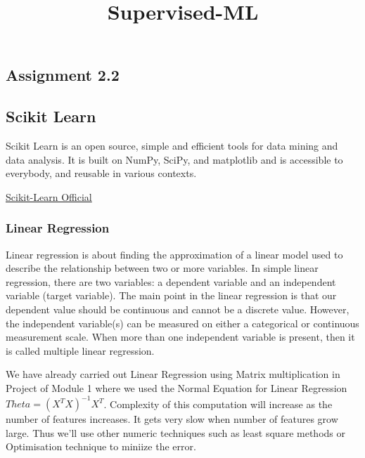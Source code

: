 \documentclass[11pt]{article}
\title{Supervised-ML}
\begin{document}
    
    
    \maketitle
    
    

    
    \hypertarget{assignment-2.2}{%
\subsection{Assignment 2.2}\label{assignment-2.2}}

\hypertarget{scikit-learn}{%
\subsection{Scikit Learn}\label{scikit-learn}}

Scikit Learn is an open source, simple and efficient tools for data
mining and data analysis. It is built on NumPy, SciPy, and matplotlib
and is accessible to everybody, and reusable in various contexts.

\href{http://scikit-learn.org/stable/}{Scikit-Learn Official}

    \hypertarget{linear-regression}{%
\subsubsection{Linear Regression}\label{linear-regression}}

Linear regression is about finding the approximation of a linear model
used to describe the relationship between two or more variables. In
simple linear regression, there are two variables: a dependent variable
and an independent variable (target variable). The main point in the
linear regression is that our dependent value should be continuous and
cannot be a discrete value. However, the independent variable(s) can be
measured on either a categorical or continuous measurement scale. When
more than one independent variable is present, then it is called
multiple linear regression.

We have already carried out Linear Regression using Matrix
multiplication in Project of Module 1 where we used the Normal Equation
for Linear Regression \(Theta = (X^TX)^{-1}X^T\). Complexity of this
computation will increase as the number of features increases. It gets
very slow when number of features grow large. Thus we'll use other
numeric techniques such as least square methods or Optimisation
technique to miniize the error.
\end{document}
